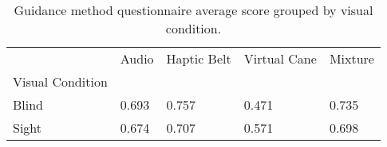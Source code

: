 
\begin{table}[!htb]
\centering
\caption{Guidance method questionnaire average score grouped by visual condition.}
\label{tab:questionnaire_average_group}
\begin{tabular}{lllll}
\toprule
{} &  Audio &  Haptic Belt &  Virtual Cane &  Mixture \\
Visual Condition &        &              &               &          \\
\midrule
Blind            &  0.693 &        0.757 &         0.471 &    0.735 \\
Sight            &  0.674 &        0.707 &         0.571 &    0.698 \\
\bottomrule
\end{tabular}
\end{table}

